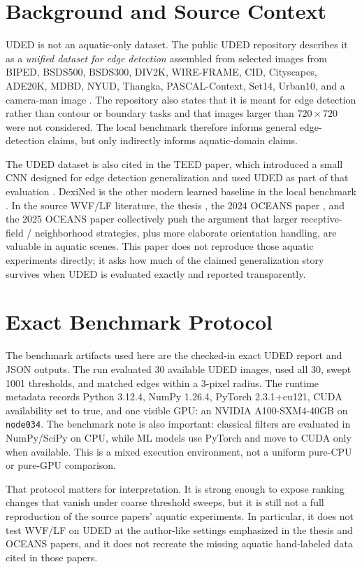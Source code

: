 \documentclass[conference]{IEEEtran}
\begin{document}
\section{Background and Source Context}
UDED is not an aquatic-only dataset. The public UDED repository describes it as a \emph{unified dataset for edge detection} assembled from selected images from BIPED, BSDS500, BSDS300, DIV2K, WIRE-FRAME, CID, Cityscapes, ADE20K, MDBD, NYUD, Thangka, PASCAL-Context, Set14, Urban10, and a camera-man image \cite{udedrepo}. The repository also states that it is meant for edge detection rather than contour or boundary tasks and that images larger than $720{\times}720$ were not considered. The local benchmark therefore informs general edge-detection claims, but only indirectly informs aquatic-domain claims.

The UDED dataset is also cited in the TEED paper, which introduced a small CNN designed for edge detection generalization and used UDED as part of that evaluation \cite{teed2023}. DexiNed is the other modern learned baseline in the local benchmark \cite{dexined2023}. In the source WVF/LF literature, the thesis \cite{bagan_thesis}, the 2024 OCEANS paper \cite{bagan_2024}, and the 2025 OCEANS paper \cite{bagan_2025} collectively push the argument that larger receptive-field / neighborhood strategies, plus more elaborate orientation handling, are valuable in aquatic scenes. This paper does not reproduce those aquatic experiments directly; it asks how much of the claimed generalization story survives when UDED is evaluated exactly and reported transparently.

\section{Exact Benchmark Protocol}
The benchmark artifacts used here are the checked-in exact UDED report and JSON outputs. The run evaluated 30 available UDED images, used all 30, swept 1001 thresholds, and matched edges within a 3-pixel radius. The runtime metadata records Python 3.12.4, NumPy 1.26.4, PyTorch 2.3.1+cu121, CUDA availability set to true, and one visible GPU: an NVIDIA A100-SXM4-40GB on \texttt{node034}. The benchmark note is also important: classical filters are evaluated in NumPy/SciPy on CPU, while ML models use PyTorch and move to CUDA only when available. This is a mixed execution environment, not a uniform pure-CPU or pure-GPU comparison.

That protocol matters for interpretation. It is strong enough to expose ranking changes that vanish under coarse threshold sweeps, but it is still not a full reproduction of the source papers' aquatic experiments. In particular, it does not test WVF/LF on UDED at the author-like settings emphasized in the thesis and OCEANS papers, and it does not recreate the missing aquatic hand-labeled data cited in those papers.
\end{document}
